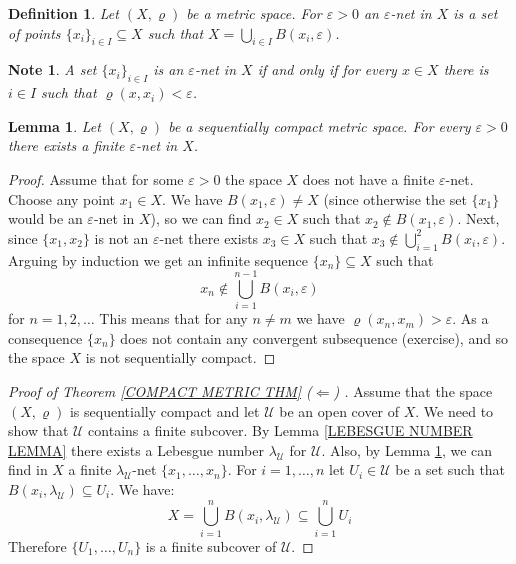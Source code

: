 \documentclass[11pt, letterpaper, oneside]{report}
\theoremstyle{pplain}
\newtheorem{lemma}[theorem]{Lemma}
\newtheorem{ITERMVALUE THM}[theorem]{Intermediate Value Theorem}
\newtheorem{HEINEBOREL THM}[theorem]{Heine-Borel Theorem}
\newtheorem{UMETR THM}[theorem]{Urysohn Metrization Theorem}
\newtheorem{UMETR2 THM}[theorem]{Urysohn Metrization Theorem (v.2)}
\theoremstyle{ddefinition}
\newtheorem{definition}[theorem]{Definition}
\newtheorem{note}[theorem]{Note}
\theoremstyle{nnn}
\newtheorem{TDA NN}[theorem]{Topological Data Analysis. }
\theoremstyle{eexercise}
\newcommand{\La}{\Leftarrow}
\newcommand{\UU}{{\mathcal U}}
\begin{document}
\begin{definition}
Let $(X, \varrho)$ be a metric space. For $\varepsilon >0 $ an \emph{$\varepsilon$-net} in $X$
is a set of points $\{x_{i}\}_{i\in I}\subseteq X$ such that $X = \bigcup_{i\in I} B(x_{i}, \varepsilon)$.  
\end{definition}

\begin{note}
A set $\{x_{i}\}_{i\in I}$ is an $\varepsilon$-net in $X$ if and only if for every $x\in X$ there is $i\in I$
such that $\varrho(x, x_{i}) < \varepsilon$.
\end{note}

\begin{lemma}
\label{FINITE EPS NET LEMMA}
Let $(X, \varrho)$ be a sequentially compact metric space. For every $\varepsilon >0$ there 
exists a finite $\varepsilon$-net  in $X$.
\end{lemma}

\begin{proof}
Assume that for some $\varepsilon >0$ the space $X$ does not have a finite $\varepsilon$-net.
Choose any point $x_{1}\in X$. We have $B(x_{1}, \varepsilon)\neq X$ (since otherwise 
the set $\{x_{1}\}$ would be an $\varepsilon$-net in $X$), so we can find $x_{2}\in X$ such that 
$x_{2}\not\in B(x_{1}, \varepsilon)$. Next, since $\{x_{1}, x_{2}\}$ is not an $\varepsilon$-net
there exists $x_{3}\in X$ such that $x_{3}\not\in \bigcup_{i=1}^{2} B(x_{i}, \varepsilon)$. Arguing 
by induction we get an infinite sequence $\{x_{n}\}\subseteq X$ such that 
$$x_{n}\not\in \bigcup_{i=1}^{n-1}B(x_{i}, \varepsilon)$$
for  $n=1, 2, \dots$ This means that for any $n\neq m$ we have $\varrho(x_{n}, x_{m}) > \varepsilon$. 
As a consequence $\{x_{n}\}$ does not contain any convergent subsequence (exercise), and so 
the space $X$ is not sequentially compact. 
\end{proof}


\begin{proof}[Proof of Theorem \ref{COMPACT METRIC THM} ($\La$) ]
Assume that the space $(X, \varrho)$ is sequentially compact and let 
$\UU$ be an open cover of $X$. We need to show that $\UU$ contains a finite subcover. 
By Lemma \ref{LEBESGUE NUMBER LEMMA} there exists a Lebesgue number 
$\lambda_{\UU}$ for $\UU$. Also, by Lemma \ref{FINITE EPS NET LEMMA}, we can find 
in $X$ a finite $\lambda_{\UU}$-net $\{ x_{1}, \dots, x_{n}\}$. For $i=1, \dots, n$ let  
$U_{i}\in \UU$ be a set such that $B(x_{i}, \lambda_{\UU})\subseteq U_{i}$. We have:
$$X = \bigcup_{i=1}^{n}B(x_{i}, \lambda_{\UU}) \subseteq \bigcup_{i=1}^{n} U_{i}$$
Therefore $\{U_{1}, \dots, U_{n}\}$ is a finite subcover of $\UU$.
\end{proof}
\end{document}
